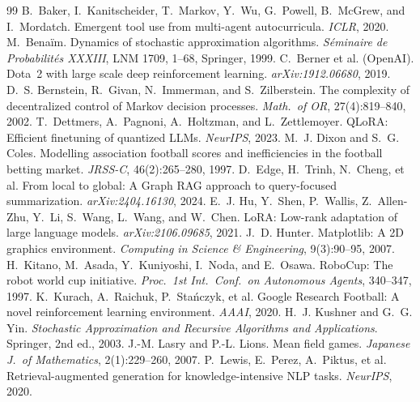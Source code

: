 \documentclass[11pt,UTF8,fontset=fandol]{ctexart}
\theoremstyle{plain}
\theoremstyle{definition}
\theoremstyle{remark}
\begin{document}
\begin{thebibliography}{99}
 B.~Baker, I.~Kanitscheider, T.~Markov, Y.~Wu, G.~Powell, B.~McGrew, and I.~Mordatch. Emergent tool use from multi-agent autocurricula. \emph{ICLR}, 2020.
 M.~Bena\"im. Dynamics of stochastic approximation algorithms. \emph{S\'eminaire de Probabilit\'es XXXIII}, LNM 1709, 1--68, Springer, 1999.
 C.~Berner et al. (OpenAI). Dota~2 with large scale deep reinforcement learning. \emph{arXiv:1912.06680}, 2019.
 D.~S. Bernstein, R.~Givan, N.~Immerman, and S.~Zilberstein. The complexity of decentralized control of Markov decision processes. \emph{Math.\ of OR}, 27(4):819--840, 2002.
 T.~Dettmers, A.~Pagnoni, A.~Holtzman, and L.~Zettlemoyer. QLoRA: Efficient finetuning of quantized LLMs. \emph{NeurIPS}, 2023.
 M.~J. Dixon and S.~G. Coles. Modelling association football scores and inefficiencies in the football betting market. \emph{JRSS-C}, 46(2):265--280, 1997.
 D.~Edge, H.~Trinh, N.~Cheng, et al. From local to global: A Graph RAG approach to query-focused summarization. \emph{arXiv:2404.16130}, 2024.
 E.~J. Hu, Y.~Shen, P.~Wallis, Z.~Allen-Zhu, Y.~Li, S.~Wang, L.~Wang, and W.~Chen. LoRA: Low-rank adaptation of large language models. \emph{arXiv:2106.09685}, 2021.
 J.~D. Hunter. Matplotlib: A 2D graphics environment. \emph{Computing in Science \& Engineering}, 9(3):90--95, 2007.
 H.~Kitano, M.~Asada, Y.~Kuniyoshi, I.~Noda, and E.~Osawa. RoboCup: The robot world cup initiative. \emph{Proc.\ 1st Int.\ Conf.\ on Autonomous Agents}, 340--347, 1997.
 K.~Kurach, A.~Raichuk, P.~Sta\'nczyk, et al. Google Research Football: A novel reinforcement learning environment. \emph{AAAI}, 2020.
 H.~J. Kushner and G.~G. Yin. \emph{Stochastic Approximation and Recursive Algorithms and Applications}. Springer, 2nd ed., 2003.
 J.-M. Lasry and P.-L. Lions. Mean field games. \emph{Japanese J.\ of Mathematics}, 2(1):229--260, 2007.
 P.~Lewis, E.~Perez, A.~Piktus, et al. Retrieval-augmented generation for knowledge-intensive NLP tasks. \emph{NeurIPS}, 2020.

\end{thebibliography}
\end{document}
